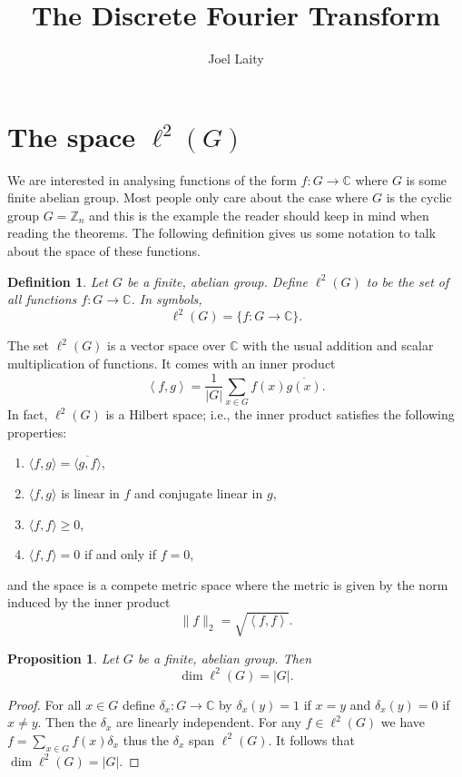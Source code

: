 \documentclass[12pt]{article}
\title{The Discrete Fourier Transform}
\author{Joel Laity}
\newtheorem{Definition}{Definition}
\newtheorem{Proposition}{Proposition}
\newcommand{\Z}{\mathbb{Z}}
\newcommand{\C}{\mathbb{C}}
\begin{document}
\maketitle

\section{The space $\ell^2(G)$}

We are interested in analysing functions of the form $f:G\to \C$ where $G$ is some finite abelian group.
Most people only care about the case where $G$ is the cyclic group $G = \Z_n$ and this is the example the reader should keep in mind when reading the theorems.
The following definition gives us some notation to talk about the space of these functions.


\begin{Definition} %
    Let $G$ be a finite, abelian group.
    Define $\ell^2(G)$ to be the set of all functions $f:G\to \C$.
    In symbols,
    \[
        \ell^2(G)=\{f:G\to \C\}.
    \]
\end{Definition}



The set $\ell^2(G)$ is a vector space over $\C$ with the usual addition and scalar multiplication of functions.
It comes with an  inner product
\[
    \left<f,g\right> =\frac{1}{|G|}\sum_{x \in G}f(x)\overline{g(x)}.
\]
In fact, $\ell^2(G)$ is a Hilbert space; i.e., the inner product satisfies the following properties:
\begin{enumerate}
    \item $\langle f, g \rangle = \overline{\langle g, f\rangle}$,
    \item $\langle f, g \rangle$ is linear in $f$ and conjugate linear in $g$,
    \item $\langle f, f \rangle \geq 0$,
    \item $\langle f, f \rangle = 0$ if and only if $f = 0$,
\end{enumerate}
and the space is a compete metric space where the metric is given by the norm induced by the inner product
\[
    \| f\|_2=\sqrt{\left<f,f\right>}.
\]



\begin{Proposition} \label{dimension} %
    Let $G$ be a finite, abelian group.
    Then
    \[
        \dim \ell^2(G)=|G|.
    \]
\end{Proposition}
\begin{proof}
    For all $x\in G$ define $\delta_x:G\to \C$ by $\delta_x(y)=1$ if $x=y$ and $\delta_x(y)=0$ if $x\neq y$.
    Then the $\delta_x$ are linearly independent.
    For any $f\in \ell^2(G)$ we have $f=\sum_{x\in G}f(x)\delta_x$ thus the $\delta_x$ span $\ell^2(G)$.
    It follows that $\dim \ell^2(G)=|G|.$
\end{proof}
\end{document}
